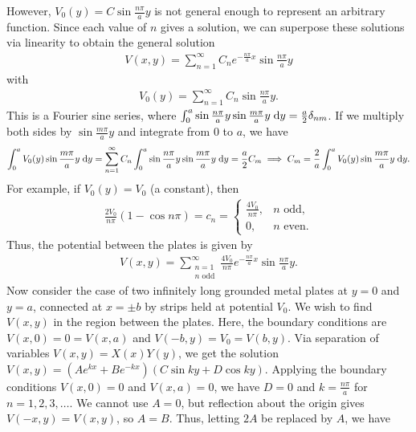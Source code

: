 However, $V_{0}(y) = C \sin \frac{n \pi}{a} y$ is not general enough to represent an arbitrary function. Since each value of $n$ gives a solution, we can superpose these solutions via linearity to obtain the general solution
\begin{align}
    V(x,y) = \sum_{n=1}^{\infty} C_{n} e^{-\frac{n \pi}{a} x} \sin \frac{n \pi}{a} y
\end{align}
with
\begin{align}
    V_{0}(y) = \sum_{n=1}^{\infty} C_{n} \sin \frac{n \pi}{a} y.
\end{align}
This is a Fourier sine series, where $\int_{0}^{a} \sin \frac{n \pi}{a} y \sin \frac{m \pi}{a} y \; \mathrm{d}y = \frac{a}{2} \delta_{nm}$. If we multiply both sides by $\sin \frac{m \pi}{a} y$ and integrate from $0$ to $a$, we have
\begin{align}
    \int_{0}^{a} V_{0}(y) \sin \frac{m \pi}{a} y \; \mathrm{d}y = \sum_{n=1}^{\infty} C_{n} \int_{0}^{a} \sin \frac{n \pi}{a} y \sin \frac{m \pi}{a} y \; \mathrm{d}y = \frac{a}{2} C_{m} \implies C_{m} = \frac{2}{a} \int_{0}^{a} V_{0}(y) \sin \frac{m \pi}{a} y \; \mathrm{d}y.
\end{align}
For example, if $V_{0}(y) = V_{0}$ (a constant), then
\begin{align}
    \frac{2V_{0}}{n \pi} (1 - \cos n \pi) = c_{n} = \begin{cases}
        \frac{4 V_{0}}{n \pi}, & n \text{ odd}, \\
        0, & n \text{ even}.
\end{cases}
\end{align}
Thus, the potential between the plates is given by
\begin{align}
    V(x,y) = \sum_{\substack{n=1 \\ n \text{ odd}}}^{\infty} \frac{4 V_{0}}{n \pi} e^{-\frac{n \pi}{a} x} \sin \frac{n \pi}{a} y.
\end{align}
Now consider the case of two infinitely long grounded metal plates at $y = 0$ and $y = a$, connected at $x = \pm b$ by strips held at potential $V_{0}$. We wish to find $V(x,y)$ in the region between the plates. Here, the boundary conditions are $V(x,0) = 0 = V(x,a)$ and $V(-b,y) = V_{0} = V(b,y)$. Via separation of variables $V(x,y) = X(x) Y(y)$, we get the solution $V(x,y) = (Ae^{kx} + Be^{-kx})(C \sin ky + D \cos ky)$. Applying the boundary conditions $V(x,0) = 0$ and $V(x,a) = 0$, we have $D = 0$ and $k = \frac{n \pi}{a}$ for $n = 1, 2, 3, \ldots$. We cannot use $A = 0$, but reflection about the origin gives $V(-x,y) = V(x,y)$, so $A = B$. Thus, letting $2A$ be replaced by $A$, we have
